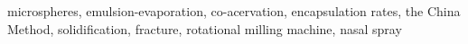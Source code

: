 ﻿\documentclass[12pt,conference,onecolumn]{IEEEtran}
\newcommand{\keywords}{microspheres, emulsion-evaporation, co-acervation, encapsulation rates, the China Method, solidification, fracture, rotational milling machine, nasal spray}
\begin{document}
\begin{abstract}



\end{abstract}

\begin{IEEEkeywords}
\keywords
\end{IEEEkeywords}
\end{document}
